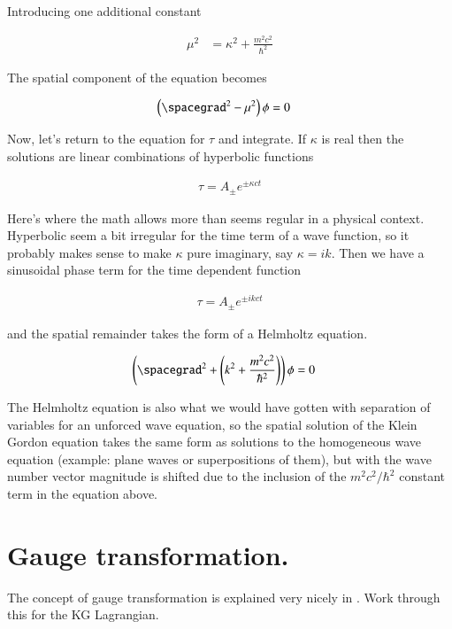 Introducing one additional constant

\begin{align*}
\mu^2 &= \kappa^2 + \frac{m^2 c^2}{\hbar^2}
\end{align*}

The spatial component of the equation becomes

\begin{align*}
\left( \spacegrad^2 - \mu^2 \right) \phi &= 0
\end{align*}

Now, let's return to the equation for $\tau$ and integrate.  If $\kappa$ is real then the solutions are linear
combinations of hyperbolic functions

\begin{align*}
\tau = A_{\pm} e^{\pm \kappa c t}
\end{align*}

Here's where the math allows more than seems regular in a physical context.  Hyperbolic seem a bit irregular for the time term of a wave function, so it probably makes sense to make $\kappa$
pure imaginary, say $\kappa = i k$.  Then we have a sinusoidal phase term for the time dependent function

\begin{align*}
\tau = A_{\pm} e^{\pm i k c t}
\end{align*}

and the spatial remainder takes the form of a Helmholtz equation.

\begin{align*}
\left( \spacegrad^2 + \left( k^2 + \frac{m^2 c^2}{\hbar^2} \right) \right) \phi &= 0
\end{align*}

The Helmholtz equation is also what we would have gotten with separation of variables for an unforced wave
equation, so the spatial solution of the Klein Gordon equation takes the same form as solutions to the
homogeneous wave equation (example: plane waves or superpositions of them), but with the wave number vector magnitude is shifted due to the inclusion of
the $m^2 c^2/\hbar^2$ constant term in the equation above.

\section{Gauge transformation. }

The concept of gauge transformation is explained very nicely in \cite{vtgauge}.  Work through this
for the KG Lagrangian.

